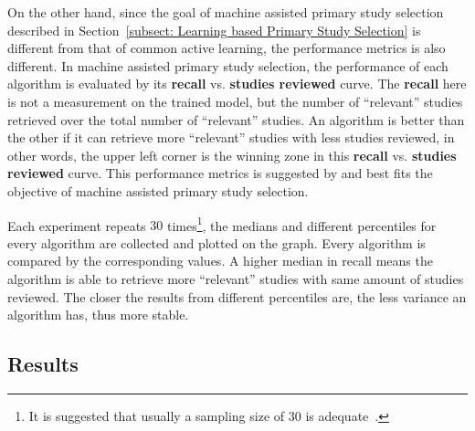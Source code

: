 \documentclass[final,twocolumn,5p]{elsarticle}
\theoremstyle{break}
\begin{document}
On the other hand, since the goal of machine assisted primary study selection described in Section~\ref{subsect: Learning based Primary Study Selection} is different from that of common active learning, the performance metrics is also different. In machine assisted primary study selection, the performance of each algorithm is evaluated by its \textbf{recall} vs. \textbf{studies reviewed} curve. The \textbf{recall} here is not a measurement on the trained model, but the number of ``relevant'' studies retrieved over the total number of ``relevant'' studies. An algorithm is better than the other if it can retrieve more ``relevant'' studies with less studies reviewed, in other words, the upper left corner is the winning zone in this \textbf{recall} vs. \textbf{studies reviewed} curve. This performance metrics is suggested by \cite{cormack2015autonomy,cormack2014evaluation,tredennick2015} and best fits the objective of machine assisted primary study selection.

Each experiment repeats $30$ times\footnote{It is suggested that usually a sampling size of $30$ is adequate~\cite{isotalo2001basics}.}, the medians and different percentiles for every algorithm are collected and plotted on the graph. Every algorithm is compared by the corresponding values. A higher median in recall means the algorithm is able to retrieve more ``relevant'' studies with same amount of studies reviewed. The closer the results from different percentiles are, the less variance an algorithm has, thus more stable.


\subsection{Results}
\label{subsect: Results}
\end{document}
